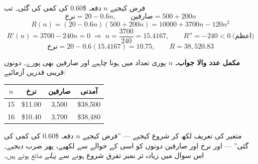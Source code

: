 \begin{hal}
فرض کیجیے \(n\) دفعہ \textenglish{\$0.60} کی کمی کی گئی۔ تب
\[
\text{نرخ}=20-0.6n,
\qquad
\text{صارفین}=500+200n
\]
\[
R(n)=(20-0.6n)(500+200n)=10000+3700n-120n^{2}
\]
\[
R'(n)=3700-240n=0 \;\Longrightarrow\; n=\frac{3700}{240}=15.4167,
\qquad
R''=-240<0 \ \text{(اعظم)}
\]
\[
\text{نرخ}=20-0.6(15.4167)=10.75,
\qquad
R=38{,}520.83
\]

\medskip
\textbf{مکمل عدد والا جواب۔} \(n\) پوری تعداد میں ہونا چاہیے اور صارفین بھی
پورے۔ دونوں قریبی قدریں آزمائیے:

\medskip
\begin{center}
\begin{ltrtab}
\begin{tabular}{@{}c c c c@{}}
\toprule
$n$ & نرخ & صارفین & آمدنی \\
\midrule
15 & \$11.00 & 3{,}500 & \$38{,}500 \\
16 & \$10.40 & 3{,}700 & \$38{,}480 \\
\bottomrule
\end{tabular}
\end{ltrtab}
\end{center}

\end{hal}

\begin{ghalti}
متغیر کی تعریف لکھ کر شروع کیجیے --- ''فرض کیجیے \(n\) دفعہ
\textenglish{\$0.60} کی کمی کی گئی'' --- اور نرخ اور صارفین دونوں کو اسی کے
حوالے سے لکھیے، پھر ضرب دیجیے۔ اس سوال میں زیادہ تر نمبر تفرق شروع ہونے سے
\emph{پہلے} ضائع ہوتے ہیں۔
\end{ghalti}
